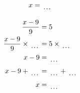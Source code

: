 \documentclass[12pt]{article}
\newcounter{minipagecount}
\begin{document}
\begin{multicols}{2}
\begin{minipage}[t]{0.45\textwidth}
\begin{align*}
        x &= \dotuline{\hspace{5mm}}\\
    \end{align*}
\end{minipage} %
\noindent{(\theminipagecount)}\hspace{0.1mm} %
\begin{minipage}[t]{0.45\textwidth} %
    \vspace{-26pt}  %
    \raggedright %
    \begin{align*} %
        \frac{x - 9}{9} &= 5\\
        \frac{x - 9}{9} \times\dotuline{\hspace{5mm}} &= 5 \times\dotuline{\hspace{5mm}}\\
        x - 9 &= \dotuline{\hspace{5mm}}\\
        x - 9 + \dotuline{\hspace{5mm}} &= \dotuline{\hspace{5mm}} + \dotuline{\hspace{5mm}}\\
        x &= \dotuline{\hspace{5mm}}\\
    \end{align*}
\end{minipage} %
\noindent{(\theminipagecount)}\hspace{0.1mm} %
\begin{minipage}[t]{0.45\textwidth} %
    \vspace{-26pt}  %

\end{minipage}
\end{multicols}
\end{document}
